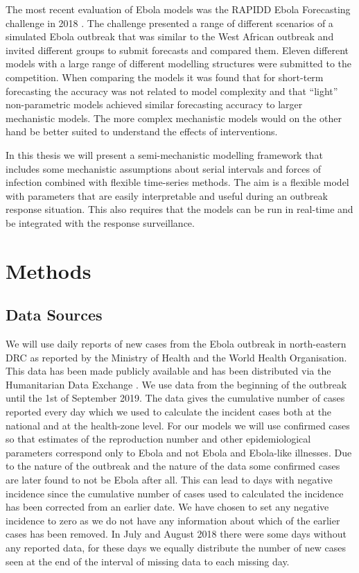 \documentclass[12pt]{article}
\begin{document}
The most recent evaluation of Ebola models was the RAPIDD Ebola Forecasting challenge in 2018 \cite{viboudRAPIDDEbolaForecasting2018}. The challenge presented a range of different scenarios of a simulated Ebola outbreak that was similar to the West African outbreak and invited different groups to submit forecasts and compared them. Eleven different models with a large range of different modelling structures were submitted to the competition. When comparing the models it was found that for short-term forecasting the accuracy was not related to model complexity and that ``light'' non-parametric models achieved similar forecasting accuracy to larger mechanistic models. The more complex mechanistic models would on the other hand be better suited to understand the effects of interventions. 

In this thesis we will present a semi-mechanistic modelling framework that includes some mechanistic assumptions about serial intervals and forces of infection combined with flexible time-series methods. The aim is a flexible model with parameters that are easily interpretable and useful during an outbreak response situation. This also requires that the models can be run in real-time and be integrated with the response surveillance. 

\section{Methods}

\subsection{Data Sources}

We will use daily reports of new cases from the Ebola outbreak in north-eastern DRC as reported by the Ministry of Health and the World Health Organisation. This data has been made publicly available and has been distributed via the Humanitarian Data Exchange \cite{hummanitariandataexchangeEbolaCasesDeaths}. We use data from the beginning of the outbreak until the 1st of September 2019. The data gives the cumulative number of cases reported every day which we used to calculate the incident cases both at the national and at the health-zone level. For our models we will use confirmed cases so that estimates of the reproduction number and other epidemiological parameters correspond only to Ebola and not Ebola and Ebola-like illnesses. Due to the nature of the outbreak and the nature of the data some confirmed cases are later found to not be Ebola after all. This can lead to days with negative incidence since the cumulative number of cases used to calculated the incidence has been corrected from an earlier date. We have chosen to set any negative incidence to zero as we do not have any information about which of the earlier cases has been removed. In July and August 2018 there were some days without any reported data, for these days we equally distribute the number of new cases seen at the end of the interval of missing data to each missing day. 
\end{document}
